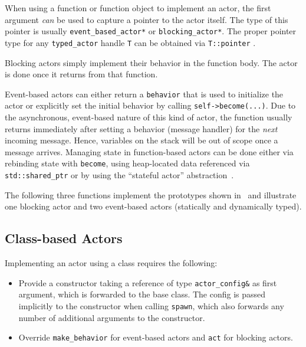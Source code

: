 When using a function or function object to implement an actor, the first
argument \emph{can} be used to capture a pointer to the actor itself. The type
of this pointer is usually \lstinline^event_based_actor*^ or
\lstinline^blocking_actor*^. The proper pointer type for any
\lstinline^typed_actor^ handle \lstinline^T^ can be obtained via
\lstinline^T::pointer^ .

Blocking actors simply implement their behavior in the function body. The actor
is done once it returns from that function.

Event-based actors can either return a \lstinline^behavior^
 that is used to initialize the actor or explicitly set
the initial behavior by calling \lstinline^self->become(...)^. Due to the
asynchronous, event-based nature of this kind of actor, the function usually
returns immediately after setting a behavior (message handler) for the
\emph{next} incoming message. Hence, variables on the stack will be out of
scope once a message arrives. Managing state in function-based actors can be
done either via rebinding state with \lstinline^become^, using heap-located
data referenced via \lstinline^std::shared_ptr^ or by using the ``stateful
actor'' abstraction~.

The following three functions implement the prototypes shown in~
and illustrate one blocking actor and two event-based actors (statically and
dynamically typed).

\clearpage
{}

\clearpage
\subsection{Class-based Actors}
\label{class-based}

Implementing an actor using a class requires the following:
\begin{itemize}
\item Provide a constructor taking a reference of type
  \lstinline^actor_config&^ as first argument, which is forwarded to the base
    class. The config is passed implicitly to the constructor when calling
    \lstinline^spawn^, which also forwards any number of additional arguments
    to the constructor.
\item Override \lstinline^make_behavior^ for event-based actors and
  \lstinline^act^ for blocking actors.
\end{itemize}

